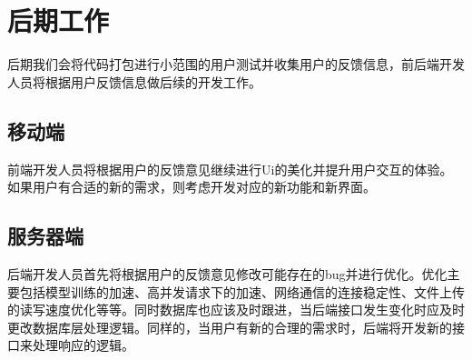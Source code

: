 \section{后期工作}
后期我们会将代码打包进行小范围的用户测试并收集用户的反馈信息，前后端开发人员将根据用户反馈信息做后续的开发工作。
\subsection{移动端}
前端开发人员将根据用户的反馈意见继续进行Ui的美化并提升用户交互的体验。如果用户有合适的新的需求，则考虑开发对应的新功能和新界面。

\subsection{服务器端}
后端开发人员首先将根据用户的反馈意见修改可能存在的bug并进行优化。优化主要包括模型训练的加速、高并发请求下的加速、网络通信的连接稳定性、文件上传的读写速度优化等等。同时数据库也应该及时跟进，当后端接口发生变化时应及时更改数据库层处理逻辑。同样的，当用户有新的合理的需求时，后端将开发新的接口来处理响应的逻辑。